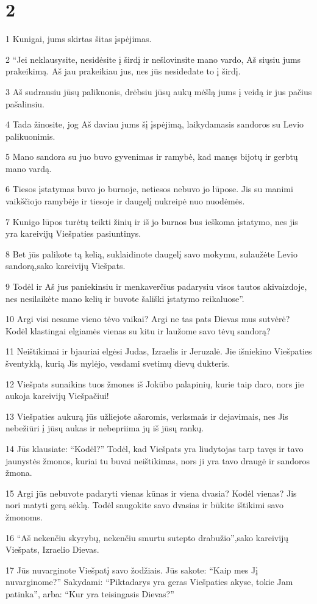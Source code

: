 \chapter{2}


\par 1 Kunigai, jums skirtas šitas įspėjimas. 
\par 2 “Jei neklausysite, nesidėsite į širdį ir nešlovinsite mano vardo, Aš siųsiu jums prakeikimą. Aš jau prakeikiau jus, nes jūs nesidedate to į širdį. 
\par 3 Aš sudrausiu jūsų palikuonis, drėbsiu jūsų aukų mėšlą jums į veidą ir jus pačius pašalinsiu. 
\par 4 Tada žinosite, jog Aš daviau jums šį įspėjimą, laikydamasis sandoros su Levio palikuonimis. 
\par 5 Mano sandora su juo buvo gyvenimas ir ramybė, kad manęs bijotų ir gerbtų mano vardą. 
\par 6 Tiesos įstatymas buvo jo burnoje, netiesos nebuvo jo lūpose. Jis su manimi vaikščiojo ramybėje ir tiesoje ir daugelį nukreipė nuo nuodėmės. 
\par 7 Kunigo lūpos turėtų teikti žinių ir iš jo burnos bus ieškoma įstatymo, nes jis yra kareivijų Viešpaties pasiuntinys. 
\par 8 Bet jūs palikote tą kelią, suklaidinote daugelį savo mokymu, sulaužėte Levio sandorą,­sako kareivijų Viešpats.­ 
\par 9 Todėl ir Aš jus paniekinsiu ir menkaverčius padarysiu visos tautos akivaizdoje, nes nesilaikėte mano kelių ir buvote šališki įstatymo reikaluose”. 
\par 10 Argi visi nesame vieno tėvo vaikai? Argi ne tas pats Dievas mus sutvėrė? Kodėl klastingai elgiamės vienas su kitu ir laužome savo tėvų sandorą? 
\par 11 Neištikimai ir bjauriai elgėsi Judas, Izraelis ir Jeruzalė. Jie išniekino Viešpaties šventyklą, kurią Jis mylėjo, vesdami svetimų dievų dukteris. 
\par 12 Viešpats sunaikins tuos žmones iš Jokūbo palapinių, kurie taip daro, nors jie aukoja kareivijų Viešpačiui! 
\par 13 Viešpaties aukurą jūs užliejote ašaromis, verksmais ir dejavimais, nes Jis nebežiūri į jūsų aukas ir nebepriima jų iš jūsų rankų. 
\par 14 Jūs klausiate: “Kodėl?” Todėl, kad Viešpats yra liudytojas tarp tavęs ir tavo jaunystės žmonos, kuriai tu buvai neištikimas, nors ji yra tavo draugė ir sandoros žmona. 
\par 15 Argi jūs nebuvote padaryti vienas kūnas ir viena dvasia? Kodėl vienas? Jis nori matyti gerą sėklą. Todėl saugokite savo dvasias ir būkite ištikimi savo žmonoms. 
\par 16 “Aš nekenčiu skyrybų, nekenčiu smurtu sutepto drabužio”,­sako kareivijų Viešpats, Izraelio Dievas. 
\par 17 Jūs nuvarginote Viešpatį savo žodžiais. Jūs sakote: “Kaip mes Jį nuvarginome?” Sakydami: “Piktadarys yra geras Viešpaties akyse, tokie Jam patinka”, arba: “Kur yra teisingasis Dievas?”



